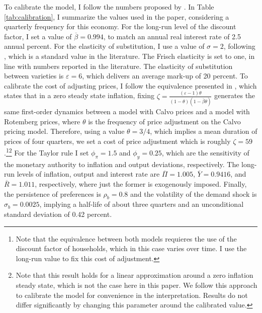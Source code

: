 \documentclass[12pt]{article}
\numberwithin{equation}{section}
\begin{document}
To calibrate the model, I follow the numbers proposed by \cite{Fernandez-VillaverdeEtAl2015}. In Table \ref{tab:calibration}, I summarize the values used in the paper, considering a quarterly frequency for this economy. For the long-run level of the discount factor, I set a value of $\overline{\beta}=0.994$, to match an annual real interest rate of 2.5 annual percent. For the elasticity of substitution, I use a value of $\sigma=2$, following \cite{Gali2015}, which is a standard value in the literature. The Frisch elasticity is set to one, in line with numbers reported in the literature. The elasticity of substitution between varieties is $\varepsilon=6$, which delivers an average mark-up of 20 percent. To calibrate the cost of adjusting prices, I follow the equivalence presented in \cite{AscariEtAl2012}, which states that in a zero steady state inflation, fixing $\zeta=\frac{(\varepsilon-1)\theta}{(1-\theta)(1-\overline{\beta}\theta)}$ generates the same first-order dynamics between a model with Calvo prices and a model with Rotemberg prices, where $\theta$ is the frequency of price adjustment on the Calvo pricing model. Therefore, using a value $\theta=3/4$, which implies a mean duration of prices of four quarters, we set a cost of price adjustment which is roughly $\zeta=59$.\footnote{Note that the equivalence between both models requieres the use of the discount factor of households, which in this case varies over time. I use the long-run value to fix this cost of adjustment.}\footnote{Note that this result holds for a linear approximation around a zero inflation steady state, which is not the case here in this paper. We follow this approach to calibrate the model for convenience in the interpretation. Results do not differ significantly by changing this parameter around the calibrated value.} For the Taylor rule I set $\phi_{\pi}=1.5$ and $\phi_{y}=0.25$, which are the sensitivity of the monetary authority to inflation and output deviations, respectively. The long-run levels of inflation, output and interest rate are $\overline\Pi=1.005$, $\overline Y=0.9416$, and $\overline R=1.011$, respectively, where just the former is exogenously imposed. Finally, the persistence of preferences is $\rho_b=0.8$ and the volatility of the demand shock is $\sigma_b=0.0025$, implying a half-life of about three quarters and an unconditional standard deviation of 0.42 percent. 
\end{document}

